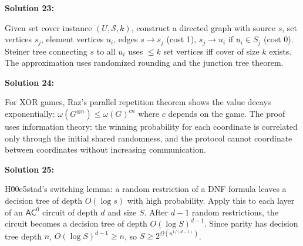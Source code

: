 \documentclass[12pt,a4paper]{exam}
\begin{document}
\textbf{Solution 23:}

Given set cover instance $(U,\mathcal{S},k)$, construct a directed graph with source $s$, set vertices $s_j$, element vertices $u_i$, edges $s \to s_j$ (cost 1), $s_j \to u_i$ if $u_i \in S_j$ (cost 0). Steiner tree connecting $s$ to all $u_i$ uses $\leq k$ set vertices iff cover of size $k$ exists. The approximation uses randomized rounding and the junction tree theorem.

\vspace{0.5cm}

\textbf{Solution 24:}

For XOR games, Raz's parallel repetition theorem shows the value decays exponentially: $\omega(G^{\otimes n}) \leq \omega(G)^{c n}$ where $c$ depends on the game. The proof uses information theory: the winning probability for each coordinate is correlated only through the initial shared randomness, and the protocol cannot coordinate between coordinates without increasing communication.

\vspace{0.5cm}

\textbf{Solution 25:}

H\u00e5stad's switching lemma: a random restriction of a DNF formula leaves a decision tree of depth $O(\log s)$ with high probability. Apply this to each layer of an $\mathsf{AC}^0$ circuit of depth $d$ and size $S$. After $d-1$ random restrictions, the circuit becomes a decision tree of depth $O(\log S)^{d-1}$. Since parity has decision tree depth $n$, $O(\log S)^{d-1} \geq n$, so $S \geq 2^{\Omega(n^{1/(d-1)})}$.

\vspace{0.5cm}
\end{document}
